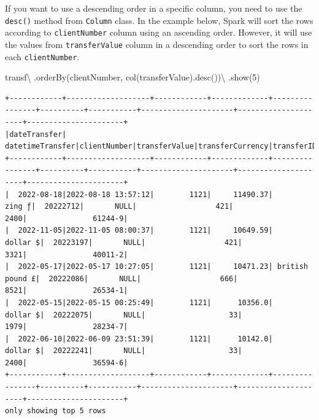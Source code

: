 \documentclass[
  11pt,
  letterpaper,
  DIV=11,
  numbers=noendperiod]{scrreprt}
\newenvironment{Shaded}{\begin{snugshade}}{\end{snugshade}}
\newcommand{\DecValTok}[1]{\textcolor[rgb]{0.68,0.00,0.00}{#1}}
\newcommand{\NormalTok}[1]{\textcolor[rgb]{0.00,0.23,0.31}{#1}}
\newcommand{\OperatorTok}[1]{\textcolor[rgb]{0.37,0.37,0.37}{#1}}
\newcommand{\StringTok}[1]{\textcolor[rgb]{0.13,0.47,0.30}{#1}}
\begin{document}
If you want to use a descending order in a specific column, you need to
use the \texttt{desc()} method from \texttt{Column} class. In the
example below, Spark will sort the rows according to
\texttt{clientNumber} column using an ascending order. However, it will
use the values from \texttt{transferValue} column in a descending order
to sort the rows in each \texttt{clientNumber}.

\begin{Shaded}
\begin{Highlighting}[]
\NormalTok{transf}\OperatorTok{\textbackslash{}}
\NormalTok{  .orderBy(}\StringTok{\textquotesingle{}clientNumber\textquotesingle{}}\NormalTok{, col(}\StringTok{\textquotesingle{}transferValue\textquotesingle{}}\NormalTok{).desc())}\OperatorTok{\textbackslash{}}
\NormalTok{  .show(}\DecValTok{5}\NormalTok{)}
\end{Highlighting}
\end{Shaded}

\begin{verbatim}
+------------+-------------------+------------+-------------+----------------+----------+-----------+---------------------+---------------------+----------------------+
|dateTransfer|   datetimeTransfer|clientNumber|transferValue|transferCurrency|transferID|transferLog|destinationBankNumber|destinationBankBranch|destinationBankAccount|
+------------+-------------------+------------+-------------+----------------+----------+-----------+---------------------+---------------------+----------------------+
|  2022-08-18|2022-08-18 13:57:12|        1121|     11490.37|          zing ƒ|  20222712|       NULL|                  421|                 2400|               61244-9|
|  2022-11-05|2022-11-05 08:00:37|        1121|     10649.59|        dollar $|  20223197|       NULL|                  421|                 3321|               40011-2|
|  2022-05-17|2022-05-17 10:27:05|        1121|     10471.23| british pound £|  20222086|       NULL|                  666|                 8521|               26534-1|
|  2022-05-15|2022-05-15 00:25:49|        1121|      10356.0|        dollar $|  20222075|       NULL|                   33|                 1979|               28234-7|
|  2022-06-10|2022-06-09 23:51:39|        1121|      10142.0|        dollar $|  20222241|       NULL|                   33|                 2400|               36594-6|
+------------+-------------------+------------+-------------+----------------+----------+-----------+---------------------+---------------------+----------------------+
only showing top 5 rows
\end{verbatim}
\end{document}
